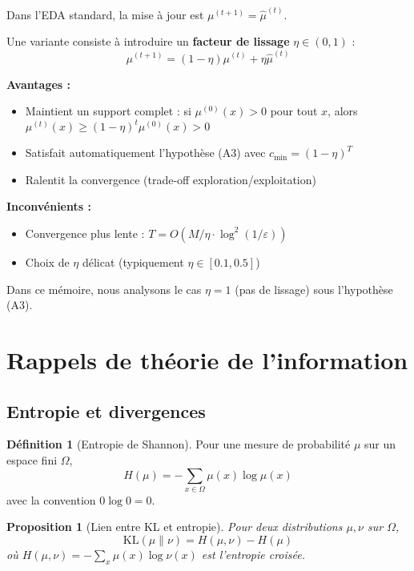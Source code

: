\documentclass[12pt,a4paper]{article}
\newtheorem{proposition}[theorem]{Proposition}
\theoremstyle{definition}
\newtheorem{definition}[theorem]{Définition}
\theoremstyle{remark}
\newcommand{\KL}{\text{KL}}
\begin{document}
Dans l'EDA standard, la mise à jour est $\mu^{(t+1)} = \hat{\mu}^{(t)}$.

Une variante consiste à introduire un \textbf{facteur de lissage} $\eta \in (0,1)$ :
\begin{equation}
	\mu^{(t+1)} = (1-\eta) \mu^{(t)} + \eta \hat{\mu}^{(t)}
\end{equation}

\textbf{Avantages :}
\begin{itemize}
	\item Maintient un support complet : si $\mu^{(0)}(x) > 0$ pour tout $x$, 
	alors $\mu^{(t)}(x) \geq (1-\eta)^t \mu^{(0)}(x) > 0$
	\item Satisfait automatiquement l'hypothèse (A3) avec $c_{\min} = (1-\eta)^T$
	\item Ralentit la convergence (trade-off exploration/exploitation)
\end{itemize}

\textbf{Inconvénients :}
\begin{itemize}
	\item Convergence plus lente : $T = O(M/\eta \cdot \log^2(1/\varepsilon))$
	\item Choix de $\eta$ délicat (typiquement $\eta \in [0.1, 0.5]$)
\end{itemize}

Dans ce mémoire, nous analysons le cas $\eta = 1$ (pas de lissage) sous l'hypothèse (A3).
\section{Rappels de théorie de l'information}

\subsection{Entropie et divergences}

\begin{definition}[Entropie de Shannon]
Pour une mesure de probabilité $\mu$ sur un espace fini $\Omega$,
\begin{equation}
	H(\mu) = -\sum_{x\in\Omega} \mu(x) \log \mu(x)
\end{equation}
avec la convention $0 \log 0 = 0$.
\end{definition}

\begin{proposition}[Lien entre KL et entropie]
Pour deux distributions $\mu, \nu$ sur $\Omega$,
\begin{equation}
	\KL(\mu\|\nu) = H(\mu, \nu) - H(\mu)
\end{equation}
où $H(\mu, \nu) = -\sum_x \mu(x) \log \nu(x)$ est l'entropie croisée.
\end{proposition}
\end{document}
